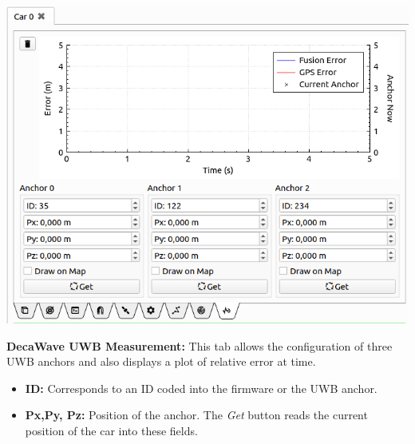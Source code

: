 \documentclass[12pt]{article} %
\def\printtodos{0}
\newcommand{\todo}[1]{
  \if\printtodos1
      {\color{red} \textbf{TODO:} #1}
  \fi}
\begin{document}
\noindent\begin{minipage}{0.5\textwidth}
  \noindent \includegraphics[width=\textwidth]{./screens/Car_UWB.png}
\end{minipage}
\begin{minipage}{0.5\textwidth} %
  {\bf DecaWave UWB Measurement:} This tab allows the configuration of
  three UWB anchors and also displays a plot of relative error at
  time.
  \begin{itemize}
  \item {\bf ID:} Corresponds to an ID coded into the firmware or the UWB anchor.
  \item {\bf Px,Py, Pz:} Position of the anchor. The {\em Get} button
    reads the current position of the car into these fields. 
  \end{itemize} 
\end{minipage}



\end{document}
